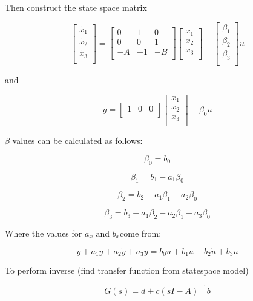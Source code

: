 \documentclass[a0,landscape]{article}
\begin{document}
\begin{multicols}{3}
Then construct the state space matrix

\[\begin{bmatrix}
\dot{x_{1}} \\
\dot{x_{2}} \\
\dot{x_{3}} \\
\end{bmatrix} = \begin{bmatrix}
0 & 1 & 0 \\
0 & 0 & 1 \\
 - A & - 1 & - B \\
\end{bmatrix}\begin{bmatrix}
x_{1} \\
x_{2} \\
x_{3} \\
\end{bmatrix} + \begin{bmatrix}
\beta_{1} \\
\beta_{2} \\
\beta_{3} \\
\end{bmatrix}u\]

and

\[y = \begin{bmatrix}
1 & 0 & 0 \\
\end{bmatrix}\begin{bmatrix}
x_{1} \\
x_{2} \\
x_{3} \\
\end{bmatrix} + \beta_{0}u\]

\(\beta\) values can be calculated as follows:

\[\beta_{0} = b_{0}\]

\[\beta_{1} = b_{1} - a_{1}\beta_{0}\]

\[\beta_{2} = b_{2} - a_{1}\beta_{1} - a_{2}\beta_{0}\]

\[\beta_{3} = b_{3} - a_{1}\beta_{2} - a_{2}\beta_{1} - a_{3}\beta_{0}\]

Where the values for \(a_{x}\text{\ and\ }b_{x}\)come from:

\[\dddot{y} + a_{1}\ddot{y} + a_{2}\dot{y} + a_{3}y = b_{0}\dddot{u} + b_{1}\ddot{u} + b_{2}\dot{u} + b_{3}u\]

To perform inverse (find transfer function from statespace model)

\[G\left( s \right) = d + c{(sI - A)}^{- 1}b\]


\end{multicols}
\end{document}
